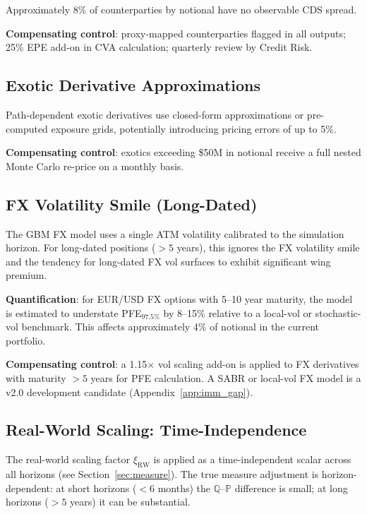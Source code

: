 \documentclass[11pt,a4paper]{article}
\begin{document}
Approximately 8\% of counterparties by notional have no observable CDS spread.

\textbf{Compensating control}: proxy-mapped counterparties flagged in all
outputs; 25\% EPE add-on in CVA calculation; quarterly review by Credit Risk.

\subsection{Exotic Derivative Approximations}

Path-dependent exotic derivatives use closed-form approximations or
pre-computed exposure grids, potentially introducing pricing errors of up to 5\%.

\textbf{Compensating control}: exotics exceeding \$50M in notional receive a
full nested Monte Carlo re-price on a monthly basis.

\subsection{FX Volatility Smile (Long-Dated)}
\label{sec:fx_smile}

The GBM FX model uses a single ATM volatility calibrated to the simulation
horizon. For long-dated positions ($>5$ years), this ignores the FX
volatility smile and the tendency for long-dated FX vol surfaces to exhibit
significant wing premium.

\textbf{Quantification}: for EUR/USD FX options with 5--10 year maturity,
the model is estimated to understate PFE$_{97.5\%}$ by 8--15\% relative to
a local-vol or stochastic-vol benchmark. This affects approximately 4\% of
notional in the current portfolio.

\textbf{Compensating control}: a 1.15$\times$ vol scaling add-on is applied
to FX derivatives with maturity $>5$ years for PFE calculation. A SABR or
local-vol FX model is a v2.0 development candidate (Appendix~\ref{app:imm_gap}).

\subsection{Real-World Scaling: Time-Independence}

The real-world scaling factor $\xi_{\text{RW}}$ is applied as a
time-independent scalar across all horizons (see Section~\ref{sec:measure}).
The true measure adjustment is horizon-dependent: at short horizons
($<6$ months) the $\mathbb{Q}$--$\mathbb{P}$ difference is small; at long
horizons ($>5$ years) it can be substantial.
\end{document}
